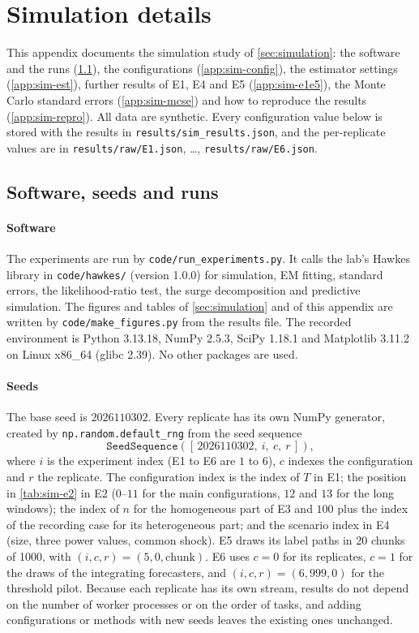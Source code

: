 \section{Simulation details}\label{app:simdetails}

This appendix documents the simulation study of \cref{sec:simulation}: the software and
the runs (\cref{app:sim-run}), the configurations (\cref{app:sim-config}), the estimator
settings (\cref{app:sim-est}), further results of E1, E4 and E5 (\cref{app:sim-e1e5}), the
Monte Carlo standard errors (\cref{app:sim-mcse}) and how to reproduce the results
(\cref{app:sim-repro}). All data are synthetic. Every configuration value below is stored
with the results in \texttt{results/sim\_results.json}, and the per-replicate values are in
\texttt{results/raw/E1.json}, \dots, \texttt{results/raw/E6.json}.

\subsection{Software, seeds and runs}\label{app:sim-run}

\paragraph{Software} The experiments are run by \texttt{code/run\_experiments.py}. It
calls the lab's Hawkes library in \texttt{code/hawkes/} (version 1.0.0) for simulation,
EM fitting, standard errors, the likelihood-ratio test, the surge decomposition and
predictive simulation. The figures and tables of \cref{sec:simulation} and of this appendix
are written by \texttt{code/make\_figures.py} from the results file. The recorded
environment is Python 3.13.18, NumPy 2.5.3, SciPy 1.18.1 and Matplotlib 3.11.2 on Linux
x86\_64 (glibc 2.39). No other packages are used.

\paragraph{Seeds} The base seed is $2026110302$. Every replicate has its own NumPy
generator, created by \texttt{np.random.default\_rng} from the seed sequence
\[
\mathtt{SeedSequence}([\,2026110302,\ i,\ c,\ r\,]),
\]
where $i$ is the experiment index (E1 to E6 are $1$ to $6$), $c$ indexes the configuration
and $r$ the replicate. The configuration index is the index of $T$ in E1; the position in
\cref{tab:sim-e2} in E2 ($0$--$11$ for the main configurations, $12$ and $13$ for the long
windows); the index of $n$ for the homogeneous part of E3 and $100$ plus the index of the
recording case for its heterogeneous part; and the scenario index in E4 (size, three power
values, common shock). E5 draws its label paths in 20 chunks of 1000, with
$(i,c,r)=(5,0,\text{chunk})$. E6 uses $c=0$ for its replicates, $c=1$ for the draws of the
integrating forecasters, and $(i,c,r)=(6,999,0)$ for the threshold pilot. Because each
replicate has its own stream, results do not depend on the number of worker processes or
on the order of tasks, and adding configurations or methods with new seeds leaves the
existing ones unchanged.

